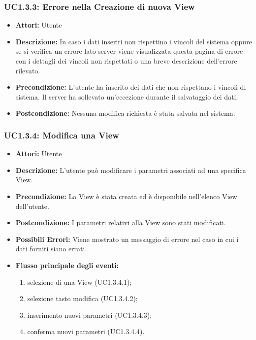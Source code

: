 \subsubsection{UC1.3.3: Errore nella Creazione di nuova View}

\begin{itemize}
    \item \textbf{Attori:} Utente
    \item \textbf{Descrizione:} In caso i dati inseriti non rispettino i vincoli del sistema oppure se si verifica un errore lato server viene visualizzata questa pagina di errore con i dettagli dei vincoli non rispettati o una breve descrizione dell'errore rilevato.
    \item \textbf{Precondizione:} L'utente ha inserito dei dati che non rispettano i vincoli dl sistema. Il server ha sollevato un'eccezione durante il salvataggio dei dati.
    \item \textbf{Postcondizione:} Nessuna modifica richiesta è stata salvata nel sistema.
\end{itemize}

\subsubsection{UC1.3.4: Modifica una View}

\begin{itemize}
    \item \textbf{Attori:} Utente
    \item \textbf{Descrizione:} L'utente può modificare i parametri associati ad una specifica View.
    \item \textbf{Precondizione:} La View è stata creata ed è disponibile nell'elenco View dell'utente.
    \item \textbf{Postcondizione:} I parametri relativi alla View sono stati modificati.

	\item \textbf{Possibili Errori:}
    Viene mostrato un messaggio di errore nel caso in cui i dati forniti siano errati.
    \item \textbf{Flusso principale degli eventi:}

    \begin{enumerate}
        \item selezione di una View (UC1.3.4.1);
        \item selezione tasto modifica (UC1.3.4.2);
        \item inserimento nuovi parametri (UC1.3.4.3);
        \item conferma nuovi parametri (UC1.3.4.4).
    \end{enumerate}

\end{itemize}

